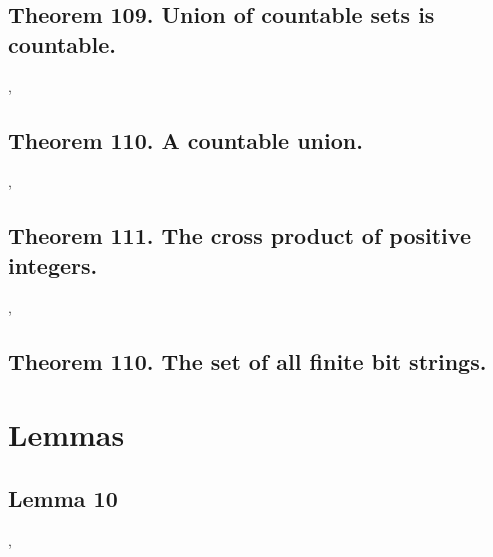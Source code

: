 \documentclass[preview]{standalone}
\begin{document}
\subsection[Union of countable sets is countable.]{
    \color{section} Theorem 109. \color{black} Union of countable sets is countable.
}

\sep
\pagebreak


\subsection[A countable union of countable sets is countable.]{
    \color{section} Theorem 110. \color{black} A countable union.
}

\sep
\pagebreak


\subsection[The Cartesian product of positive integers.]{
    \color{section} Theorem 111. \color{black} The cross product of positive integers.
}

\sep


\subsection[The set of all finite bit strings is countable.]{
    \color{section} Theorem 110. \color{black} The set of all finite bit strings.
}



\section{Lemmas}
\subsection[Lemma 10]{\color{section}Lemma 10}

\sep
\pagebreak


\end{document}
